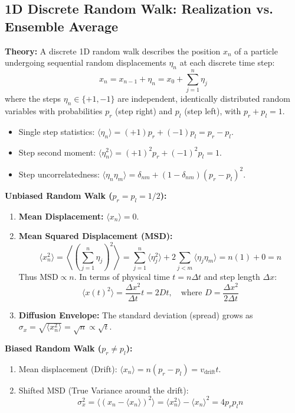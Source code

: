 \documentclass{article}
\begin{document}
\subsection{1D Discrete Random Walk: Realization vs. Ensemble Average}
\textbf{Theory:} A discrete 1D random walk describes the position $x_n$ of a particle undergoing sequential random displacements $\eta_n$ at each discrete time step:
$$x_n = x_{n-1} + \eta_n = x_0 + \sum_{j=1}^n \eta_j$$
where the steps $\eta_n \in \{+1, -1\}$ are independent, identically distributed random variables with probabilities $p_r$ (step right) and $p_l$ (step left), with $p_r + p_l = 1$.
\begin{itemize}
    \item Single step statistics: $\langle \eta_n \rangle = (+1)p_r + (-1)p_l = p_r - p_l$.
    \item Step second moment: $\langle \eta_n^2 \rangle = (+1)^2 p_r + (-1)^2 p_l = 1$.
    \item Step uncorrelatedness: $\langle \eta_n \eta_m \rangle = \delta_{nm} + (1 - \delta_{nm})(p_r - p_l)^2$.
\end{itemize}

\textbf{Unbiased Random Walk ($p_r = p_l = 1/2$):}
\begin{enumerate}
    \item \textbf{Mean Displacement:} $\langle x_n \rangle = 0$.
    \item \textbf{Mean Squared Displacement (MSD):}
    $$\langle x_n^2 \rangle = \left\langle \left( \sum_{j=1}^n \eta_j \right)^2 \right\rangle = \sum_{j=1}^n \langle \eta_j^2 \rangle + 2 \sum_{j < m} \langle \eta_j \eta_m \rangle = n(1) + 0 = n$$
    Thus $\text{MSD} \propto n$. In terms of physical time $t = n \Delta t$ and step length $\Delta x$:
    $$\langle x(t)^2 \rangle = \frac{\Delta x^2}{\Delta t} t = 2 D t, \quad \text{where } D = \frac{\Delta x^2}{2 \Delta t}$$
    \item \textbf{Diffusion Envelope:} The standard deviation (spread) grows as $\sigma_x = \sqrt{\langle x_n^2 \rangle} = \sqrt{n} \propto \sqrt{t}$.
\end{enumerate}

\textbf{Biased Random Walk ($p_r \neq p_l$):}
\begin{enumerate}
    \item Mean displacement (Drift): $\langle x_n \rangle = n(p_r - p_l) = v_{\text{drift}} t$.
    \item Shifted MSD (True Variance around the drift):
    $$\sigma_x^2 = \langle (x_n - \langle x_n \rangle)^2 \rangle = \langle x_n^2 \rangle - \langle x_n \rangle^2 = 4 p_r p_l n$$
\end{enumerate}
\end{document}
